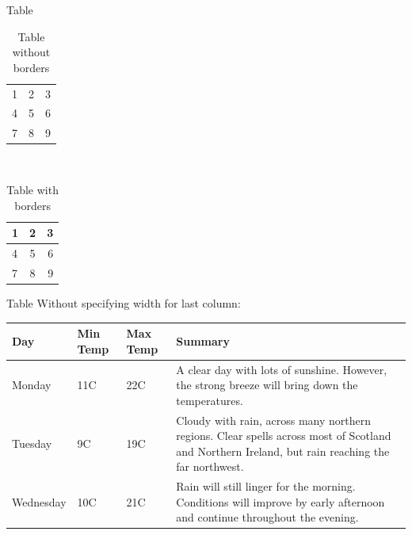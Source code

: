 \documentclass[10pt,xcolor=table]{beamer}
\begin{document}
\begin{frame}{Table}
\begin{table}
\caption{Table without borders}
\begin{tabular}{ l c r }
  1 & 2 & 3 \\
  4 & 5 & 6 \\
  7 & 8 & 9 \\
\end{tabular}\\
\end{table}

\begin{table}
\caption{Table with borders}
\begin{tabular}{| l |c| r| } 
\hline
  1 & 2 & 3 \\ \hline
  4 & 5 & 6 \\ \hline
  7 & 8 & 9 \\ \hline
\end{tabular}
\end{table}
\end{frame}


\begin{frame}{Table}
Without specifying width for last column:
\begin{center}
    \begin{tabular}{| l | l | l | l |}
    \hline
    Day & Min Temp & Max Temp & Summary \\ \hline
    Monday & 11C & 22C & A clear day with lots of sunshine.
    However, the strong breeze will bring down the temperatures. \\ \hline
    Tuesday & 9C & 19C & Cloudy with rain, across many northern regions. Clear spells
    across most of Scotland and Northern Ireland,
    but rain reaching the far northwest. \\ \hline
    Wednesday & 10C & 21C & Rain will still linger for the morning.
    Conditions will improve by early afternoon and continue
    throughout the evening. \\
    \hline
    \end{tabular}
\end{center}
\end{frame}
\end{document}
